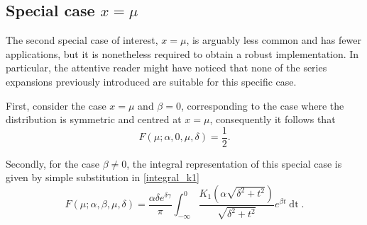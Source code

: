 \documentclass[10pt,a4paper,oneside]{article}
\numberwithin{equation}{section}
\begin{document}
\subsection{Special case $x = \mu$}
The second special case of interest, $x = \mu$, is arguably less common and has fewer applications, but it is nonetheless required to obtain a robust implementation. In particular, the attentive reader might have noticed that none of the series expansions previously introduced are suitable for this specific case.

First, consider the case $x = \mu$ and $\beta = 0$, corresponding to the case where the distribution is symmetric and centred at $x = \mu$, consequently it follows that
\begin{equation}
F(\mu; \alpha, 0, \mu, \delta) = \frac{1}{2}.
\end{equation}

Secondly, for the case $\beta \neq 0$, the integral representation of this special case is given by simple substitution in \eqref{integral_k1}
\begin{equation}\label{integral_k1_x=mu}
F(\mu; \alpha, \beta, \mu, \delta) = \frac{\alpha \delta e^{\delta \gamma}}{\pi} \int_{-\infty}^{0} \frac{K_1\left(\alpha\sqrt{\delta^2 + t^2}\right)}{\sqrt{\delta^2 + t^2}} e^{\beta t} \mathop{dt}.
\end{equation}
\end{document}
